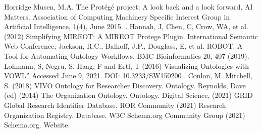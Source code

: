 \documentclass[letterpaper,10pt,english]{sphinxmanual}
\begin{document}
\begin{sphinxthebibliography}{Horridge}
Musen, M.A. The Protégé project: A look back and a look forward. AI
Matters.
Association of Computing Machinery Specific Interest Group in Artificial Intelligence,
1(4), June 2015. .
\sphinxAtStartPar
Hannah, J, Chen, C, Crow, WA, et al. (2012) Simplifying MIREOT: A
MIREOT Protege Plugin. International Semantic Web Conference,
\sphinxAtStartPar
Jackson, R.C., Balhoff, J.P., Douglass, E. et al. ROBOT: A Tool
for Automating Ontology Workflows. BMC Bioinformatics 20, 407 (2019).
\sphinxAtStartPar
Lohmann, S, Negru, S, Haag, F and Ertl, T (2016) Visualizing
Ontologies with VOWL” Accessed June 9, 2021. DOI: 10.3233/SW\sphinxhyphen{}150200
.
\sphinxAtStartPar
Conlon, M. Mitchell, S. (2018) VIVO Ontology for Researcher Discovery.
Ontology.
\sphinxAtStartPar
Reynolds, Dave (ed) (2014) The Organization Ontology.
Ontology.  
\sphinxAtStartPar
Digital Science, (2021) GRID Global Research Identifier Database.
\sphinxAtStartPar
ROR Community (2021) Research Organization Registry. Database.
\sphinxAtStartPar
W3C Schema.org Community Group (2021) Schema.org. Website.
\end{sphinxthebibliography}



\renewcommand{\indexname}{Index}
\printindex
\end{document}
